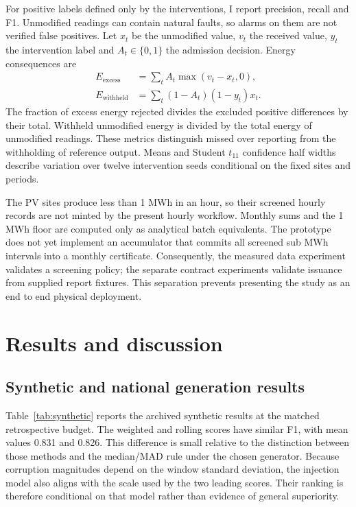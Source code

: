 \documentclass[11pt,a4paper]{article}
\begin{document}
For positive labels defined only by the interventions, I report precision, recall and F1. Unmodified readings can contain natural faults, so alarms on them are not verified false positives. Let $x_t$ be the unmodified value, $v_t$ the received value, $y_t$ the intervention label and $A_t\in\{0,1\}$ the admission decision. Energy consequences are
\begin{align}
 E_{\mathrm{excess}}&=\sum_t A_t\max(v_t-x_t,0),\\
 E_{\mathrm{withheld}}&=\sum_t (1-A_t)(1-y_t)x_t.
\end{align}
The fraction of excess energy rejected divides the excluded positive differences by their total. Withheld unmodified energy is divided by the total energy of unmodified readings. These metrics distinguish missed over reporting from the withholding of reference output. Means and Student $t_{11}$ confidence half widths describe variation over twelve intervention seeds conditional on the fixed sites and periods.

The PV sites produce less than 1 MWh in an hour, so their screened hourly records are not minted by the present hourly workflow. Monthly sums and the 1 MWh floor are computed only as analytical batch equivalents. The prototype does not yet implement an accumulator that commits all screened sub MWh intervals into a monthly certificate. Consequently, the measured data experiment validates a screening policy; the separate contract experiments validate issuance from supplied report fixtures. This separation prevents presenting the study as an end to end physical deployment.

\section{Results and discussion}
\subsection{Synthetic and national generation results}
Table~\ref{tab:synthetic} reports the archived synthetic results at the matched retrospective budget. The weighted and rolling scores have similar F1, with mean values 0.831 and 0.826. This difference is small relative to the distinction between those methods and the median/MAD rule under the chosen generator. Because corruption magnitudes depend on the window standard deviation, the injection model also aligns with the scale used by the two leading scores. Their ranking is therefore conditional on that model rather than evidence of general superiority.
\end{document}
